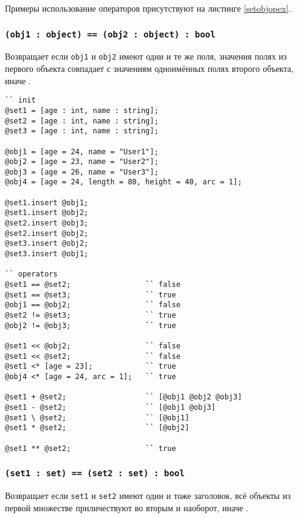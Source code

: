 Примеры использование операторов присутствуют на листинге \ref{setobjopex}.

\subsubsection{\texttt{(obj1 : object) == (obj2 : object) : bool}}

Возвращает \true{} если \texttt{obj1} и \texttt{obj2} имеют одни и те же поля, значения полях из первого объекта совпадает с значениям одноимённых полях второго объекта, иначе \false{}.

\begin{sourcecode}
\label{setobjopex}
\begin{verbatim}
`` init
@set1 = [age : int, name : string];
@set2 = [age : int, name : string];
@set3 = [age : int, name : string];

@obj1 = [age = 24, name = "User1"];
@obj2 = [age = 23, name = "User2"];
@obj3 = [age = 26, name = "User3"];
@obj4 = [age = 24, length = 80, height = 40, arc = 1];

@set1.insert @obj1;
@set1.insert @obj2;
@set2.insert @obj3;
@set2.insert @obj2;
@set3.insert @obj2;
@set3.insert @obj1;

`` operators
@set1 == @set2;					`` false
@set1 == @set3;					`` true
@obj1 == @obj2;					`` false
@set2 != @set3;					`` true
@obj2 != @obj3;					`` true

@set1 << @obj2;					`` false
@set1 << @set2;					`` false
@set1 <* [age = 23];			`` true
@obj4 <* [age = 24, arc = 1];	`` true

@set1 + @set2;					`` [@obj1 @obj2 @obj3]
@set1 - @set2;					`` [@obj1 @obj3]
@set1 \ @set2;					`` [@obj1]
@set1 * @set2;					`` [@obj2]

@set1 ** @set2;					`` true
\end{verbatim}
\end{sourcecode}

\subsubsection{\texttt{(set1 : set) == (set2 : set) : bool}}

Возвращает \true{} если \texttt{set1} и \texttt{set2} имеют один и тоже заголовок, всё объекты из первой множестве приличествуют во вторым и наоборот, иначе \false{}.

